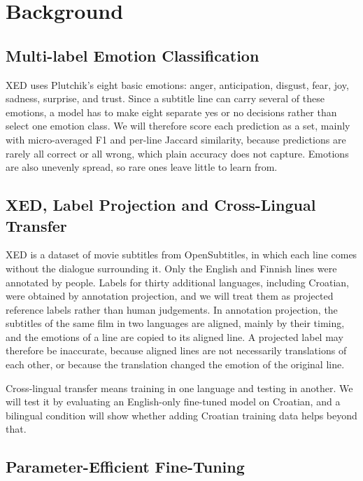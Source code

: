 \section{Background}
\label{sec:background}

\subsection{Multi-label Emotion Classification}
\label{sec:background_multilabel}

XED \parencite{ohman2020xed} uses Plutchik's eight basic emotions: anger, anticipation, disgust, fear, joy, sadness, surprise, and trust. Since a subtitle line can carry several of these emotions, a model has to make eight separate yes or no decisions rather than select one emotion class. We will therefore score each prediction as a set, mainly with micro-averaged F1 and per-line Jaccard similarity, because predictions are rarely all correct or all wrong, which plain accuracy does not capture. Emotions are also unevenly spread, so rare ones leave little to learn from.

\subsection{XED, Label Projection and Cross-Lingual Transfer}
\label{sec:background_xed}

XED is a dataset of movie subtitles from OpenSubtitles, in which each line comes without the dialogue surrounding it. Only the English and Finnish lines were annotated by people. Labels for thirty additional languages, including Croatian, were obtained by annotation projection, and we will treat them as projected reference labels rather than human judgements. In annotation projection, the subtitles of the same film in two languages are aligned, mainly by their timing, and the emotions of a line are copied to its aligned line. A projected label may therefore be inaccurate, because aligned lines are not necessarily translations of each other, or because the translation changed the emotion of the original line.

Cross-lingual transfer means training in one language and testing in another. We will test it by evaluating an English-only fine-tuned model on Croatian, and a bilingual condition will show whether adding Croatian training data helps beyond that.

\subsection{Parameter-Efficient Fine-Tuning}
\label{sec:background_peft}

